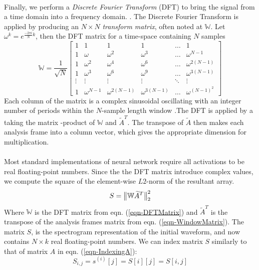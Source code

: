 \documentclass[12pt,letterpaper]{article}
\begin{document}
\paragraph*{}Finally, we perform a \textit{Discrete Fourier Transform} (DFT) to bring the signal from a time domain into a frequency domain. \cite{Olson,Peatross}. The Discrete Fourier Transform is applied by producing an $N \times N$ \textit{transform matrix}, often noted at $\mathbb{W}$. Let $\omega^k = e^{\frac{-2\pi i}{N}k}$, then the DFT matrix for a time-space containing $N$ samples
\begin{equation}
\label{eqn-DFTMatrix}
\mathbb{W} = \frac{1}{\sqrt{N}}
\begin{bmatrix}
1 & 1 & 1 & 1 & \hdots & 1 \\
1 & \omega		& \omega^2 & \omega^3 & \hdots & \omega^{N-1} \\
1 & \omega^2	& \omega^4 & \omega^6 & \hdots & \omega^{2(N-1)} \\
1 & \omega^3	& \omega^6 & \omega^9 & \hdots & \omega^{3(N-1)} \\
\vdots & \vdots & \vdots & \vdots & \ddots & \vdots \\
1 & \omega^{N-1} & \omega^{2(N-1)} & \omega^{3(N-1)} & \hdots & \omega^{(N-1)^2}
\end{bmatrix}
\end{equation}
Each column of the matrix is a complex sinusoidal oscillating with an integer number of periods within the $N$-sample length window \cite{Short,Peatross}.The DFT is applied by a taking the matrix -product of $\mathbb{W}$ and $\widetilde{A}^T$. The transpose of $\widetilde{A}$ then makes each analysis frame into a column vector, which gives the appropriate dimension for multiplication.

\paragraph*{}Most standard implementations of neural network require all activations to be real floating-point numbers. Since the the DFT matrix introduce complex values, we compute the square of the element-wise $L2$-norm of the resultant array.
\begin{equation}
\label{eqn-Spectrogram}
S = \big{\lVert} \mathbb{W}\widetilde{A}^T \big{\rVert}_{2}^{2}
\end{equation}
Where $\mathbb{W}$ is the DFT matrix from eqn. (\ref{eqn-DFTMatrix}) and $\widetilde{A}^T$ is the transpose of the analysis frames matrix from eqn. (\ref{eqn-WindowMatrix}). The matrix $S$, is the spectrogram representation of the initial waveform, and now contains $N \times k$ real floating-point numbers. We can index matrix $S$ similarly to that of matrix $A$ in eqn. (\ref{eqn-IndexingA}):
\begin{equation}
\label{eqn-IndexingS}
S_{i,j} = s^{(i)}[j] = S[i][j] = S[i,j]
\end{equation}
\end{document}
